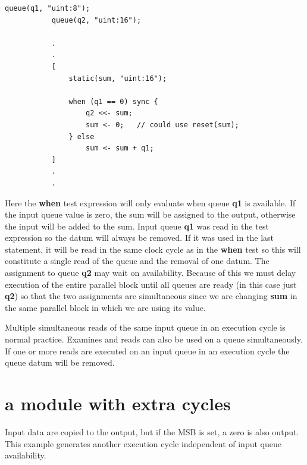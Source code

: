         \begin{lstlisting}[gobble=8, language=threepl]
           queue(q1, "uint:8");
           queue(q2, "uint:16");

           .
           .
           [
               static(sum, "uint:16");

               when (q1 == 0) sync {
                   q2 <<- sum;
                   sum <- 0;   // could use reset(sum);
               } else
                   sum <- sum + q1;
           ]
           .
           .
        \end{lstlisting}
        Here the {\bf when} test expression will only evaluate when queue {\bf
        q1} is available. If the input queue value is zero, the sum will be
        assigned to the output, otherwise the input will be added to the sum.
        Input queue {\bf q1} was read in the test expression so the datum will
        always be removed. If it was used in the last statement, it will be
        read in the same clock cycle as in the {\bf when} test so this will
        constitute a single read of the queue and the removal of one datum.
        The assignment to queue {\bf q2} may wait on availability. Because of
        this we must delay execution of the entire parallel block until all
        queues are ready (in this case just {\bf q2}) so that the two
        assignments are simultaneous since we are changing {\bf sum} in the
        same parallel block in which we are using its value.

        Multiple simultaneous reads of the same input queue in an execution
        cycle is normal practice. Examines and reads can also be used on a
        queue simultaneously. If one or more reads are executed on an input
        queue in an execution cycle the queue datum will be removed.


    \section{a module with extra cycles}\label{sec:exec}

        Input data are copied to the output, but if the MSB is
        set, a zero is also output. This example
        generates another execution cycle independent
        of input queue availability.

